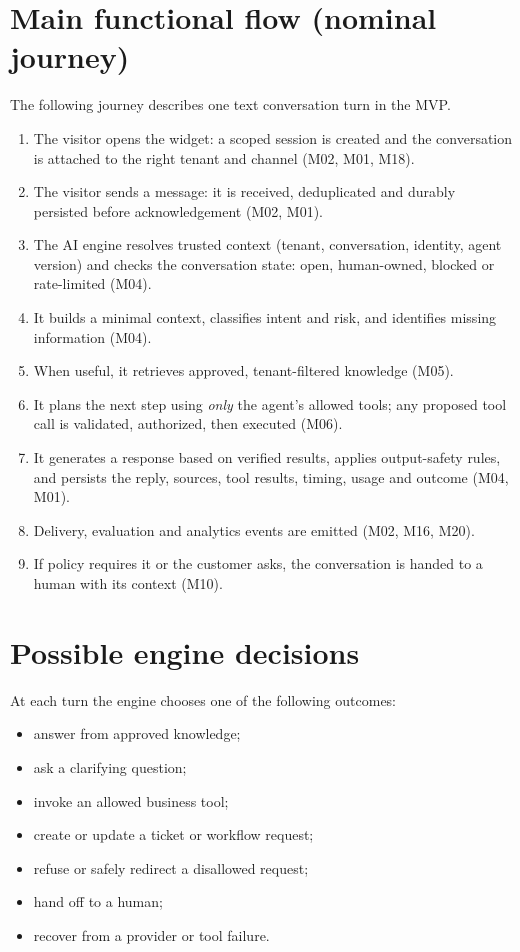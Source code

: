 \section{Main functional flow (nominal journey)}
The following journey describes one text conversation turn in the MVP.
\begin{enumerate}
  \item The visitor opens the widget: a scoped session is created and the conversation is attached to the right tenant and channel (M02, M01, M18).
  \item The visitor sends a message: it is received, deduplicated and durably persisted before acknowledgement (M02, M01).
  \item The AI engine resolves trusted context (tenant, conversation, identity, agent version) and checks the conversation state: open, human-owned, blocked or rate-limited (M04).
  \item It builds a minimal context, classifies intent and risk, and identifies missing information (M04).
  \item When useful, it retrieves approved, tenant-filtered knowledge (M05).
  \item It plans the next step using \emph{only} the agent's allowed tools; any proposed tool call is validated, authorized, then executed (M06).
  \item It generates a response based on verified results, applies output-safety rules, and persists the reply, sources, tool results, timing, usage and outcome (M04, M01).
  \item Delivery, evaluation and analytics events are emitted (M02, M16, M20).
  \item If policy requires it or the customer asks, the conversation is handed to a human with its context (M10).
\end{enumerate}


\section{Possible engine decisions}
At each turn the engine chooses one of the following outcomes:
\begin{itemize}
  \item answer from approved knowledge;
  \item ask a clarifying question;
  \item invoke an allowed business tool;
  \item create or update a ticket or workflow request;
  \item refuse or safely redirect a disallowed request;
  \item hand off to a human;
  \item recover from a provider or tool failure.
\end{itemize}

